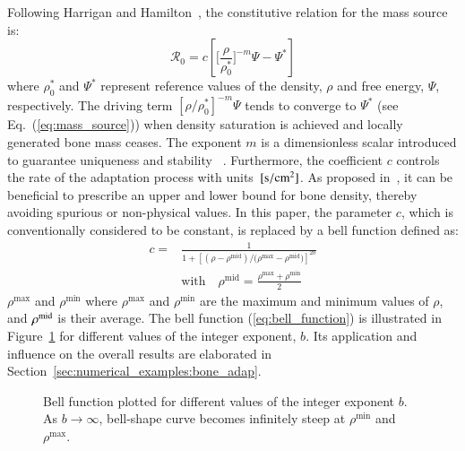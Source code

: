 \documentclass[review]{elsarticle}
\numberwithin{equation}{section}
\begin{document}
Following Harrigan and Hamilton~\citep{Harrigan1993}, the constitutive
relation for the mass source is:
\begin{equation}
\mathcal{R}_{0}=c\left[\Biggl[\frac{\rho}{\rho_{0}^{\ast}}\Biggr]^{-m}\Psi
-\Psi^{\ast}\right]
\label{eq:mass_source}
\end{equation}
where $\rho_0^\ast$ and $\Psi^\ast$ represent reference values of the
density, $\rho$ and free energy, $\Psi$, respectively. The driving term
$\left[ \rho / \rho_0^\ast \right]^{-m}\Psi$ tends to converge to
$\Psi^\ast$ (see Eq.~(\ref{eq:mass_source})) when density saturation is
achieved and locally generated bone mass ceases. The exponent $m$ is a
dimensionless scalar introduced to guarantee uniqueness and
stability~\citep{Harrigan1993} . Furthermore, the coefficient $c$ controls
the rate of the adaptation process with units~$[\rm{s/cm^2}]$. As proposed
in~\citep{Waffenschmidt2012}, it can be beneficial to prescribe an upper and
lower bound for bone density, thereby avoiding spurious or non-physical
values. In this paper, the parameter $c$, which is conventionally considered 
to be constant, is replaced by a bell function
defined as:
\begin{equation}
\begin{aligned}
c = & \frac{1}{1 + \left[  (\rho - \rho^{\mathrm{mid}}) / 
(\rho{^\mathrm{max}} - \rho{^\mathrm{mid})} \right]^{2 b}}\\
& \mathrm{with} \quad \rho^{\mathrm{mid}} = 
\frac{\rho{^\mathrm{max}} + \rho{^\mathrm{min}}}{2}
\end{aligned}
\label{eq:bell_function}
\end{equation}
$\rho^\mathrm{max}$ and $ \rho{^\mathrm{min}}$ where $\rho^\mathrm{max}$
and $\rho^\mathrm{min}$ are the maximum and minimum values of $\rho$, and
$\rho^{\rm {mid}}$ is their average. The bell function
(\ref{eq:bell_function}) is illustrated in Figure~\ref{fig:bell_func} for
different values of the integer exponent, $b$. Its application and influence
on the overall results are elaborated in
Section~\ref{sec:numerical_examples:bone_adap}.
\begin{figure}[!htb]
	\centering
		
		\caption{Bell function plotted for different values of the integer exponent $b$. 
		As $b \rightarrow \infty$, bell-shape curve becomes infinitely steep at 
		$\rho{^\mathrm{min}}$ and $ \rho{^\mathrm{max}}$.}
		\label{fig:bell_func}
\end{figure}
\end{document}
